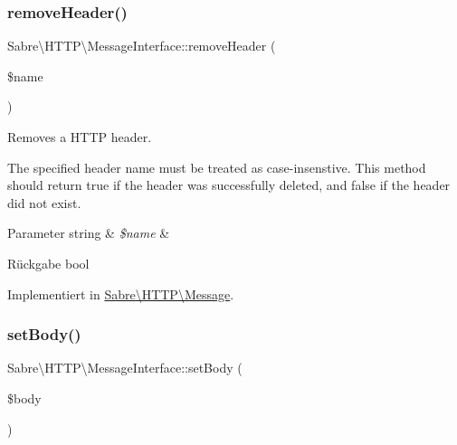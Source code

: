 \mbox{\label{interface_sabre_1_1_h_t_t_p_1_1_message_interface_a8753c1a48f9b80b341983bc414fbd85d}} 
\subsubsection{\texorpdfstring{remove\+Header()}{removeHeader()}}
{\footnotesize\ttfamily Sabre\textbackslash{}\+H\+T\+T\+P\textbackslash{}\+Message\+Interface\+::remove\+Header (\begin{DoxyParamCaption}\item[{}]{\$name }\end{DoxyParamCaption})}

Removes a H\+T\+TP header.

The specified header name must be treated as case-\/insenstive. This method should return true if the header was successfully deleted, and false if the header did not exist.


\begin{DoxyParams}[1]{Parameter}
string & {\em \$name} & \\
\hline
\end{DoxyParams}
\begin{DoxyReturn}{Rückgabe}
bool 
\end{DoxyReturn}


Implementiert in \mbox{\hyperlink{class_sabre_1_1_h_t_t_p_1_1_message_a0a6fae5616cd2131464eb1263e78c5c7}{Sabre\textbackslash{}\+H\+T\+T\+P\textbackslash{}\+Message}}.

\mbox{\label{interface_sabre_1_1_h_t_t_p_1_1_message_interface_a9bda348f19928cf4972ba2835d0be73c}} 
\subsubsection{\texorpdfstring{set\+Body()}{setBody()}}
{\footnotesize\ttfamily Sabre\textbackslash{}\+H\+T\+T\+P\textbackslash{}\+Message\+Interface\+::set\+Body (\begin{DoxyParamCaption}\item[{}]{\$body }\end{DoxyParamCaption})}

